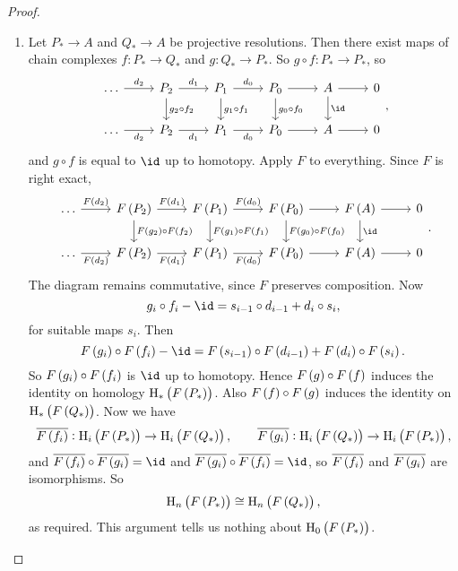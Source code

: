 
\begin{proof}
\hfill
\begin{enumerate}
\item Let $ P_* \to A $ and $ Q_* \to A $ be projective resolutions. Then there exist maps of chain complexes $ f : P_* \to Q_* $ and $ g : Q_* \to P_* $. So $ g \circ f : P_* \to P_* $, so
$$
\begin{tikzcd}
\dots \arrow{r}{d_2} & P_2 \arrow{r}{d_1} \arrow{d}{g_2 \circ f_2} & P_1 \arrow{r}{d_0} \arrow{d}{g_1 \circ f_1} & P_0 \arrow{r} \arrow{d}{g_0 \circ f_0} & A \arrow{r} \arrow{d}{\id} & 0 \\
\dots \arrow[swap]{r}{d_2} & P_2 \arrow[swap]{r}{d_1} & P_1 \arrow[swap]{r}{d_0} & P_0 \arrow{r} & A \arrow{r} & 0
\end{tikzcd},
$$
and $ g \circ f $ is equal to $ \id $ up to homotopy. Apply $ F $ to everything. Since $ F $ is right exact,
$$
\begin{tikzcd}
\dots \arrow{r}{F\br{d_2}} & F\br{P_2} \arrow{r}{F\br{d_1}} \arrow{d}{F\br{g_2} \circ F\br{f_2}} & F\br{P_1} \arrow{r}{F\br{d_0}} \arrow{d}{F\br{g_1} \circ F\br{f_1}} & F\br{P_0} \arrow{r} \arrow{d}{F\br{g_0} \circ F\br{f_0}} & F\br{A} \arrow{r} \arrow{d}{\id} & 0 \\
\dots \arrow[swap]{r}{F\br{d_2}} & F\br{P_2} \arrow[swap]{r}{F\br{d_1}} & F\br{P_1} \arrow[swap]{r}{F\br{d_0}} & F\br{P_0} \arrow{r} & F\br{A} \arrow{r} & 0
\end{tikzcd}.
$$
The diagram remains commutative, since $ F $ preserves composition. Now
$$ g_i \circ f_i - \id = s_{i - 1} \circ d_{i - 1} + d_i \circ s_i, $$
for suitable maps $ s_i $. Then
$$ F\br{g_i} \circ F\br{f_i} - \id = F\br{s_{i - 1}} \circ F\br{d_{i - 1}} + F\br{d_i} \circ F\br{s_i}. $$
So $ F\br{g_i} \circ F\br{f_i} $ is $ \id $ up to homotopy. Hence $ F\br{g} \circ F\br{f} $ induces the identity on homology $ \H_*\br{F\br{P_*}} $. Also $ F\br{f} \circ F\br{g} $ induces the identity on $ \H_*\br{F\br{Q_*}} $. Now we have
$$ \overline{F\br{f_i}} : \H_i\br{F\br{P_*}} \to \H_i\br{F\br{Q_*}}, \qquad \overline{F\br{g_i}} : \H_i\br{F\br{Q_*}} \to \H_i\br{F\br{P_*}}, $$
and $ \overline{F\br{f_i}} \circ \overline{F\br{g_i}} = \id $ and $ \overline{F\br{g_i}} \circ \overline{F\br{f_i}} = \id $, so $ \overline{F\br{f_i}} $ and $ \overline{F\br{g_i}} $ are isomorphisms. So
$$ \H_n\br{F\br{P_*}} \cong \H_n\br{F\br{Q_*}}, $$
as required. This argument tells us nothing about $ \H_0\br{F\br{P_*}} $.


\end{enumerate}
\end{proof}

